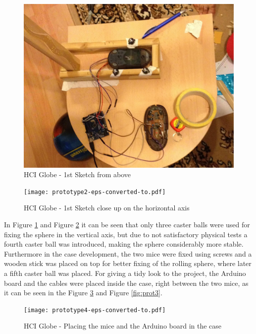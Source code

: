 \documentclass[12pt]{article}
\begin{document}
\begin{figure}[h!]\centering
\includegraphics[scale=0.10]{prototype1-eps-converted-to.pdf} 
\caption{HCI Globe - 1st Sketch from above}\centering 
\label{fig:prot1}
\end{figure}	

\begin{figure}[ht!]\centering
\texttt{[image: prototype2-eps-converted-to.pdf]} 
\caption{HCI Globe - 1st Sketch close up on the horizontal axis}\centering 
\label{fig:prot2}
\end{figure}	

In Figure \ref{fig:prot1} and Figure \ref{fig:prot2} it can be seen that only three caster balls were used for fixing the sphere in the vertical axis, but due to not satisfactory physical tests a fourth caster ball was introduced, making the sphere considerably more stable. Furthermore in the case development, the two mice were fixed using screws and a wooden stick was placed on top for better fixing of the rolling sphere, where later a fifth caster ball was placed. For giving a tidy look to the project, the Arduino board and the cables were placed inside the case, right between the two mice, as it can be seen in the Figure \ref{fig:prot4} and Figure \ref{fig:prot3}. 

\begin{figure}[ht]\centering
\texttt{[image: prototype4-eps-converted-to.pdf]} 
\caption{HCI Globe - Placing the mice and the Arduino board in the case}\centering 
\label{fig:prot4}
\end{figure}	
\end{document}
